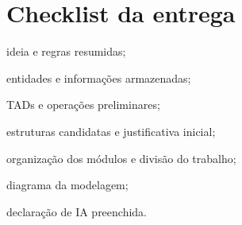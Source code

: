 \documentclass[11pt]{article}
\begin{document}
\vspace{1cm}
\DeclaracaoIA

\section{Checklist da entrega}
\begin{EntregaChecklist}
  \item ideia e regras resumidas;
  \item entidades e informações armazenadas;
  \item TADs e operações preliminares;
  \item estruturas candidatas e justificativa inicial;
  \item organização dos módulos e divisão do trabalho;
  \item diagrama da modelagem;
  \item declaração de IA preenchida.
\end{EntregaChecklist}
\end{document}
